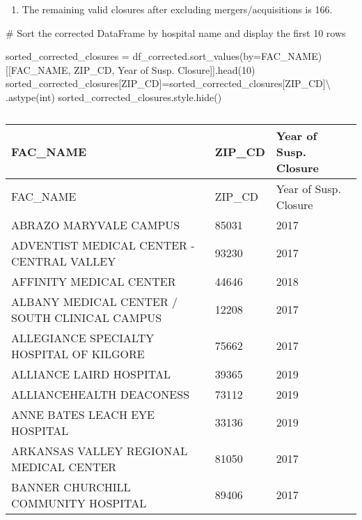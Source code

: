 \documentclass[
  letterpaper,
  DIV=11,
  numbers=noendperiod]{scrartcl}
\newenvironment{Shaded}{\begin{snugshade}}{\end{snugshade}}
\newcommand{\BuiltInTok}[1]{\textcolor[rgb]{0.00,0.23,0.31}{#1}}
\newcommand{\CommentTok}[1]{\textcolor[rgb]{0.37,0.37,0.37}{#1}}
\newcommand{\DecValTok}[1]{\textcolor[rgb]{0.68,0.00,0.00}{#1}}
\newcommand{\NormalTok}[1]{\textcolor[rgb]{0.00,0.23,0.31}{#1}}
\newcommand{\OperatorTok}[1]{\textcolor[rgb]{0.37,0.37,0.37}{#1}}
\newcommand{\StringTok}[1]{\textcolor[rgb]{0.13,0.47,0.30}{#1}}
\providecommand{\tightlist}{%
  \setlength{\itemsep}{0pt}\setlength{\parskip}{0pt}}\usepackage{longtable,booktabs,array}
\begin{document}
\begin{enumerate}
\def\labelenumi{\alph{enumi}.}
\setcounter{enumi}{2}
\tightlist
\item
  The remaining valid closures after excluding mergers/acquisitions is
  166.
\end{enumerate}

\begin{Shaded}
\begin{Highlighting}[]
\CommentTok{\# Sort the corrected DataFrame by hospital name and display the first 10 rows}

\NormalTok{sorted\_corrected\_closures }\OperatorTok{=}\NormalTok{ df\_corrected.sort\_values(by}\OperatorTok{=}\StringTok{\textquotesingle{}FAC\_NAME\textquotesingle{}}\NormalTok{)[[}\StringTok{\textquotesingle{}FAC\_NAME\textquotesingle{}}\NormalTok{, }\StringTok{\textquotesingle{}ZIP\_CD\textquotesingle{}}\NormalTok{, }\StringTok{\textquotesingle{}Year of Susp. Closure\textquotesingle{}}\NormalTok{]].head(}\DecValTok{10}\NormalTok{)}
\NormalTok{sorted\_corrected\_closures[}\StringTok{\textquotesingle{}ZIP\_CD\textquotesingle{}}\NormalTok{]}\OperatorTok{=}\NormalTok{sorted\_corrected\_closures[}\StringTok{\textquotesingle{}ZIP\_CD\textquotesingle{}}\NormalTok{]}\OperatorTok{\textbackslash{}}
\NormalTok{    .astype(}\BuiltInTok{int}\NormalTok{)}
\NormalTok{sorted\_corrected\_closures.style.hide()}
\end{Highlighting}
\end{Shaded}

\begin{longtable}[]{@{}lll@{}}
\caption{}\label{T_1bb30}\tabularnewline
\toprule\noalign{}
FAC\_NAME & ZIP\_CD & Year of Susp. Closure \\
\midrule\noalign{}
\endfirsthead
\toprule\noalign{}
FAC\_NAME & ZIP\_CD & Year of Susp. Closure \\
\midrule\noalign{}
\endhead
\bottomrule\noalign{}
\endlastfoot
ABRAZO MARYVALE CAMPUS & 85031 & 2017 \\
ADVENTIST MEDICAL CENTER - CENTRAL VALLEY & 93230 & 2017 \\
AFFINITY MEDICAL CENTER & 44646 & 2018 \\
ALBANY MEDICAL CENTER / SOUTH CLINICAL CAMPUS & 12208 & 2017 \\
ALLEGIANCE SPECIALTY HOSPITAL OF KILGORE & 75662 & 2017 \\
ALLIANCE LAIRD HOSPITAL & 39365 & 2019 \\
ALLIANCEHEALTH DEACONESS & 73112 & 2019 \\
ANNE BATES LEACH EYE HOSPITAL & 33136 & 2019 \\
ARKANSAS VALLEY REGIONAL MEDICAL CENTER & 81050 & 2017 \\
BANNER CHURCHILL COMMUNITY HOSPITAL & 89406 & 2017 \\
\end{longtable}
\end{document}
